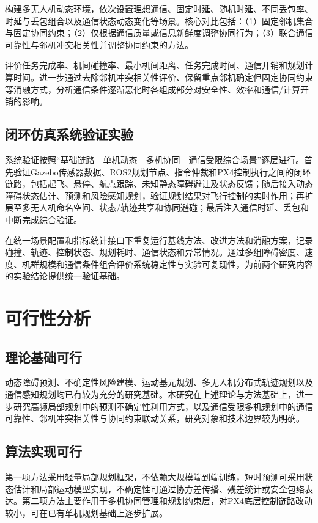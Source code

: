 构建多无人机动态环境，依次设置理想通信、固定时延、随机时延、不同丢包率、时延与丢包组合以及通信状态动态变化等场景。核心对比包括：（1）固定邻机集合与固定协同约束；（2）仅根据通信质量或信息新鲜度调整协同行为；（3）联合通信可靠性与邻机冲突相关性并调整协同约束的方法。

评价任务完成率、机间碰撞率、最小机间距离、任务完成时间、通信开销和规划计算时间。进一步通过去除邻机冲突相关性评价、保留重点邻机确定但固定协同约束等消融方式，分析通信条件逐渐恶化时各组成部分对安全性、效率和通信/计算开销的影响。

\subsection{闭环仿真系统验证实验}

系统验证按照“基础链路—单机动态—多机协同—通信受限综合场景”逐层进行。首先验证Gazebo传感器数据、ROS2规划节点、指令仲裁和PX4控制执行之间的闭环链路，包括起飞、悬停、航点跟踪、未知静态障碍避让及状态反馈；随后接入动态障碍状态估计、预测和风险感知规划，验证规划结果对飞行控制的实时作用；再扩展至多无人机命名空间、状态/轨迹共享和协同避碰；最后注入通信时延、丢包和中断完成综合验证。

在统一场景配置和指标统计接口下重复运行基线方法、改进方法和消融方案，记录碰撞、轨迹、控制状态、规划耗时、通信状态和异常情况。通过多组障碍密度、速度、机群规模和通信条件组合评价系统稳定性与实验可复现性，为前两个研究内容的实验结论提供统一验证基础。

\section{可行性分析}

\subsection{理论基础可行}

动态障碍预测、不确定性风险建模、运动基元规划、多无人机分布式轨迹规划以及通信感知规划均已有较为充分的研究基础\cite{gutow2020koopman,thomas2022sogm,wu2024sogm,robustMader}。本研究在上述理论与方法基础上，进一步研究高频局部规划中的预测不确定性利用方式，以及通信受限多机规划中的通信可靠性、邻机冲突相关性与协同约束联动关系，研究对象和技术边界较为明确。

\subsection{算法实现可行}

第一项方法采用轻量局部规划框架，不依赖大规模端到端训练，短时预测可采用状态估计和局部运动模型实现，不确定性可通过协方差传播、残差统计或安全包络表达。第二项方法主要作用于多机协同管理和规划约束层，对PX4底层控制链路改动较小，可在已有单机规划基础上逐步扩展。

